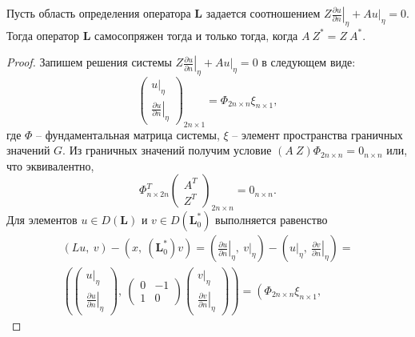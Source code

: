 \begin{theorem}
Пусть область определения оператора $\mathbf{L}$ задается соотношением $Z \left. \frac{\partial u}{\partial n} \right|_\eta + A \left. u \right|_\eta = 0$. Тогда оператор $\mathbf{L}$ самосопряжен тогда и только тогда, когда $A \ Z^* =Z \ A^*$.
\end{theorem} 
\begin{proof}
Запишем решения системы $Z \left. \frac{\partial u}{\partial n} \right|_\eta + A \left. u \right|_\eta = 0$ в следующем виде:
\begin{equation*}
\begin{pmatrix}
\left. u \right|_\eta \\
\left. \frac{\partial u}{\partial n} \right|_\eta 
\end{pmatrix}_{2n \times 1} = \Phi_{2n \times n} \xi_{n\times 1},
\end{equation*}
где $\Phi$ -- фундаментальная матрица системы, $\xi$ -- элемент пространства граничных значений $G$. 
Из граничных значений получим условие $\left( A \ Z \right) \Phi_{2n \times n} = 0_{n \times n}$ или, что эквивалентно, 
\begin{equation}
\Phi_{n \times 2n}^T \begin{pmatrix}
A^T \\
Z^T
\end{pmatrix}_{2n \times n} = 0_{n \times n}.
\label{eq:ch5:boundaryCond}
\end{equation}
Для элементов $u \in D(\mathbf{L})$ и $v \in D(\mathbf{L}_0^*)$ выполняется равенство
\begin{multline}
\left( L u, \ v \right) - \left( x, \ (\mathbf{L}_0^*) v \right) = 
\left( \left. \frac{\partial u}{\partial n} \right|_\eta ,\ \left. v \right|_\eta \right) - 
\left( \left. u \right|_\eta, \ \left. \frac{\partial v}{\partial n} \right|_\eta \right) =  \\ 
\left(
\begin{pmatrix}
	\left. u \right|_\eta \\
	\left. \frac{\partial u}{\partial n} \right|_\eta
\end{pmatrix}, \ 
\begin{pmatrix}
	0	& -1 \\
	1	& 0
\end{pmatrix}
\begin{pmatrix}
	\left. v \right|_\eta \\
	\left. \frac{\partial v}{\partial n} \right|_\eta
\end{pmatrix} 
\right) = 
\left( \Phi_{2n\times n} \xi_{n \times 1} , \ 

\end{multline}
\end{proof}
